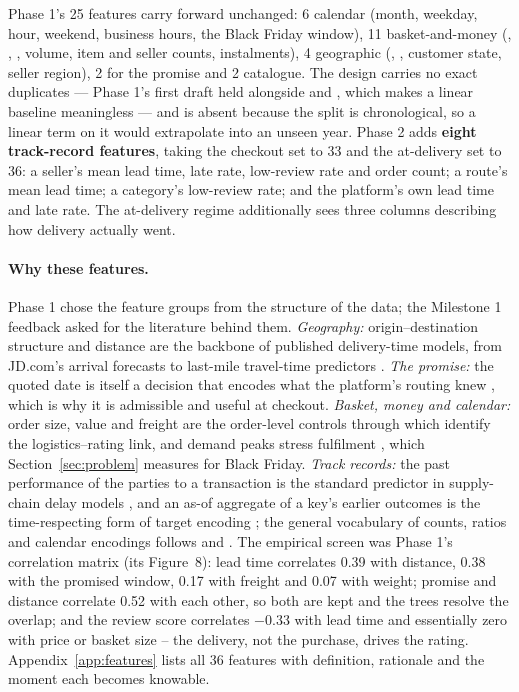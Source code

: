 Phase 1's 25 features carry forward unchanged: 6 calendar (month, weekday, hour,
weekend, business hours, the Black Friday window), 11 basket-and-money
(, , , volume, item and
seller counts, instalments), 4 geographic (,
, customer state, seller region), 2 for the promise and 2
catalogue. The design carries no exact duplicates --- Phase 1's first draft held
 alongside  and , which
makes a linear baseline meaningless --- and  is absent
because the split is chronological, so a linear term on it would extrapolate into
an unseen year. Phase 2 adds \textbf{eight track-record features}, taking the
checkout set to 33 and the at-delivery set to 36: a seller's mean lead time, late
rate, low-review rate and order count; a route's mean lead time; a category's
low-review rate; and the platform's own lead time and late rate. The at-delivery
regime additionally sees three columns describing how delivery actually went.

\paragraph{Why these features.}
Phase 1 chose the feature groups from the structure of the data; the Milestone 1
feedback asked for the literature behind them. \emph{Geography:}
origin--destination structure and distance are the backbone of published
delivery-time models, from JD.com's arrival forecasts \citep{salari2022delivery}
to last-mile travel-time predictors \citep{liu2021lastmile}. \emph{The promise:}
the quoted date is itself a decision that encodes what the platform's routing
knew \citep{cui2024promise, salari2022delivery}, which is why it is admissible
and useful at checkout. \emph{Basket, money and calendar:} order size, value and
freight are the order-level controls through which \citet{deshpande2023logistics}
identify the logistics--rating link, and demand peaks stress fulfilment
\citep{cui2024promise}, which Section~\ref{sec:problem} measures for Black
Friday. \emph{Track records:} the past performance of the parties to a
transaction is the standard predictor in supply-chain delay models
\citep{baryannis2019risk}, and an as-of aggregate of a key's earlier outcomes is
the time-respecting form of target encoding \citep{miccibarreca2001target}; the
general vocabulary of counts, ratios and calendar encodings follows
\citet{kuhn2019feature} and \citet{heaton2016feature}. The empirical screen was
Phase 1's correlation matrix (its Figure~8): lead time correlates 0.39 with
distance, 0.38 with the promised window, 0.17 with freight and 0.07 with weight;
promise and distance correlate 0.52 with each other, so both are kept and the
trees resolve the overlap; and the review score correlates $-0.33$ with lead
time and essentially zero with price or basket size -- the delivery, not the
purchase, drives the rating. Appendix~\ref{app:features} lists all 36 features
with definition, rationale and the moment each becomes knowable.

